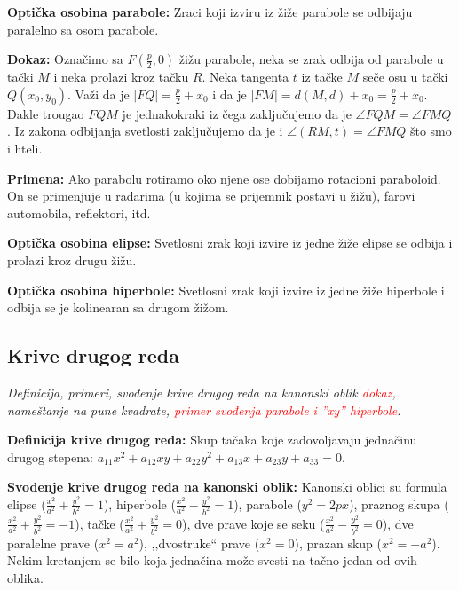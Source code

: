 \documentclass[12pt]{article}
\newcommand{\ocena}[1]{\textcolor{red}{#1}}
\begin{document}
\textbf{Optička osobina parabole:} Zraci koji izviru iz žiže parabole se
odbijaju paralelno sa osom parabole.
\par

\textbf{Dokaz:} Označimo sa $F(\frac{p}{2},0)$ žižu parabole, neka se zrak
odbija od parabole u tački $M$ i neka prolazi kroz tačku $R$. Neka tangenta $t$
iz tačke $M$ seče osu u tački $Q(x_0,y_0)$. Važi da je $|FQ|=\frac{p}{2}+x_0$ i
da je $|FM|=d(M,d)+x_0=\frac{p}{2}+x_0$. Dakle trougao $FQM$ je jednakokraki
iz čega zaključujemo da je $\angle FQM=\angle FMQ$. Iz zakona odbijanja
svetlosti zaključujemo da je i $\angle(RM,t)=\angle FMQ$ što smo i hteli.
\par

\textbf{Primena:} Ako parabolu rotiramo oko njene ose dobijamo rotacioni
paraboloid. On se primenjuje u radarima (u kojima se prijemnik postavi u žižu),
farovi automobila, reflektori, itd.
\par

\textbf{Optička osobina elipse:} Svetlosni zrak koji izvire iz jedne žiže
elipse se odbija i prolazi kroz drugu žižu.
\par

\textbf{Optička osobina hiperbole:} Svetlosni zrak koji izvire iz jedne žiže
hiperbole i odbija se je kolinearan sa drugom žižom.

\subsection{Krive drugog reda}
\textit{Definicija, primeri, svođenje krive drugog reda na kanonski oblik
    \ocena{dokaz}, nameštanje na pune kvadrate, \ocena{primer svođenja parabole i ”xy”
        hiperbole}.}
\par
\vspace*{1cm}

\textbf{Definicija krive drugog reda:} Skup tačaka koje zadovoljavaju jednačinu
drugog stepena: $a_{11}x^2+a_{12}xy+a_{22}y^2+a_{13}x+a_{23}y+a_{33}=0$.
\par

\textbf{Svođenje krive drugog reda na kanonski oblik:} Kanonski oblici su
formula elipse ($\frac{x^2}{a^2}+\frac{y^2}{b^2}=1$), hiperbole
($\frac{x^2}{a^2}-\frac{y^2}{b^2}=1$), parabole ($y^2=2px$), praznog skupa
($\frac{x^2}{a^2}+\frac{y^2}{b^2}=-1$), tačke
($\frac{x^2}{a^2}+\frac{y^2}{b^2}=0$), dve prave koje se seku
($\frac{x^2}{a^2}-\frac{y^2}{b^2}=0$), dve paralelne prave ($x^2=a^2$),
,,dvostruke`` prave ($x^2=0$), prazan skup ($x^2=-a^2$). Nekim kretanjem se
bilo koja jednačina može svesti na tačno jedan od ovih oblika.
\par
\end{document}
